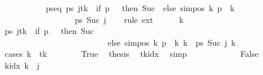 \begin{isabellebody}
\ \ \ \ \isamarkupfalse%
\isanewline
\ \ \isamarkupfalse%
\isanewline
\ \ \isamarkupfalse%
\ ps{\isacharunderscore}{\kern0pt}eq{\isacharcolon}{\kern0pt}\ {\isachardoublequoteopen}{\isacharparenleft}{\kern0pt}{\isacharquery}{\kern0pt}ps\ j{\isacharparenright}{\kern0pt}{\isacharparenleft}{\kern0pt}{\isacharquery}{\kern0pt}tk\ {\isacharcolon}{\kern0pt}{\isacharequal}{\kern0pt}\ if\ {\isacharquery}{\kern0pt}p\ {\isacharequal}{\kern0pt}\ {}\ then\ Suc\ {}\ else\ sim{\isacharunderscore}{\kern0pt}pos\ {\isacharquery}{\kern0pt}k\ {\isacharquery}{\kern0pt}p\ {\isacharplus}{\kern0pt}\ {\isacharquery}{\kern0pt}k{\isacharparenright}{\kern0pt}\isanewline
\ \ \ \ \ \ \ \ \ \ \ \ \ \ \ \ \ {\isacharequal}{\kern0pt}\ {\isacharquery}{\kern0pt}ps\ {\isacharparenleft}{\kern0pt}Suc\ j{\isacharparenright}{\kern0pt}{\isachardoublequoteclose}\isanewline
\ \ \isamarkupfalse%
\ {\isacharparenleft}{\kern0pt}rule\ ext{\isacharparenright}{\kern0pt}\isanewline
\ \ \ \ \isamarkupfalse%
\ k\isanewline
\ \ \ \ \isamarkupfalse%
\ {\isachardoublequoteopen}{\isacharparenleft}{\kern0pt}{\isacharparenleft}{\kern0pt}{\isacharquery}{\kern0pt}ps\ j{\isacharparenright}{\kern0pt}{\isacharparenleft}{\kern0pt}{\isacharquery}{\kern0pt}tk\ {\isacharcolon}{\kern0pt}{\isacharequal}{\kern0pt}\ if\ {\isacharquery}{\kern0pt}p\ {\isacharequal}{\kern0pt}\ {}\ then\ Suc\ {}\isanewline
\ \ \ \ \ \ \ \ \ \ \ \ \ \ \ \ \ \ \ \ \ \ \ \ \ \ else\ sim{\isacharunderscore}{\kern0pt}pos\ {\isacharquery}{\kern0pt}k\ {\isacharquery}{\kern0pt}p\ {\isacharplus}{\kern0pt}\ {\isacharquery}{\kern0pt}k{\isacharparenright}{\kern0pt}{\isacharparenright}{\kern0pt}\ k\ {\isacharequal}{\kern0pt}\ {\isacharquery}{\kern0pt}ps\ {\isacharparenleft}{\kern0pt}Suc\ j{\isacharparenright}{\kern0pt}\ k{\isachardoublequoteclose}\isanewline
\ \ \ \ \isamarkupfalse%
\ {\isacharparenleft}{\kern0pt}cases\ {\isachardoublequoteopen}k\ {\isacharequal}{\kern0pt}\ {\isacharquery}{\kern0pt}tk{\isachardoublequoteclose}{\isacharparenright}{\kern0pt}\isanewline
\ \ \ \ \ \ \isamarkupfalse%
\ True\ \isamarkupfalse%
\ {\isacharquery}{\kern0pt}thesis\ \isamarkupfalse%
\ tkidx\ \isamarkupfalse%
\ simp\isanewline
\ \ \ \ \isamarkupfalse%
\isanewline
\ \ \ \ \ \ \isamarkupfalse%
\ False\isanewline
\ \ \ \ \ \ \isamarkupfalse%
\ {\isachardoublequoteopen}k{\isacharunderscore}{\kern0pt}idx\ k\ {\isasymnoteq}\ j{\isachardoublequoteclose}\ \isamarkupfalse%

\end{isabellebody}
